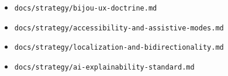 \begin{itemize}
  \begin{itemize}
  \tightlist
  \item
    \texttt{d\allowbreak{}o\allowbreak{}c\allowbreak{}s\allowbreak{}/\allowbreak{}s\allowbreak{}t\allowbreak{}r\allowbreak{}a\allowbreak{}t\allowbreak{}e\allowbreak{}g\allowbreak{}y\allowbreak{}/\allowbreak{}b\allowbreak{}i\allowbreak{}j\allowbreak{}o\allowbreak{}u\allowbreak{}-\allowbreak{}u\allowbreak{}x\allowbreak{}-\allowbreak{}d\allowbreak{}o\allowbreak{}c\allowbreak{}t\allowbreak{}r\allowbreak{}i\allowbreak{}n\allowbreak{}e\allowbreak{}.\allowbreak{}m\allowbreak{}d}
  \item
    \texttt{d\allowbreak{}o\allowbreak{}c\allowbreak{}s\allowbreak{}/\allowbreak{}s\allowbreak{}t\allowbreak{}r\allowbreak{}a\allowbreak{}t\allowbreak{}e\allowbreak{}g\allowbreak{}y\allowbreak{}/\allowbreak{}a\allowbreak{}c\allowbreak{}c\allowbreak{}e\allowbreak{}s\allowbreak{}s\allowbreak{}i\allowbreak{}b\allowbreak{}i\allowbreak{}l\allowbreak{}i\allowbreak{}t\allowbreak{}y\allowbreak{}-\allowbreak{}a\allowbreak{}n\allowbreak{}d\allowbreak{}-\allowbreak{}a\allowbreak{}s\allowbreak{}s\allowbreak{}i\allowbreak{}s\allowbreak{}t\allowbreak{}i\allowbreak{}v\allowbreak{}e\allowbreak{}-\allowbreak{}m\allowbreak{}o\allowbreak{}d\allowbreak{}e\allowbreak{}s\allowbreak{}.\allowbreak{}m\allowbreak{}d}
  \item
    \texttt{d\allowbreak{}o\allowbreak{}c\allowbreak{}s\allowbreak{}/\allowbreak{}s\allowbreak{}t\allowbreak{}r\allowbreak{}a\allowbreak{}t\allowbreak{}e\allowbreak{}g\allowbreak{}y\allowbreak{}/\allowbreak{}l\allowbreak{}o\allowbreak{}c\allowbreak{}a\allowbreak{}l\allowbreak{}i\allowbreak{}z\allowbreak{}a\allowbreak{}t\allowbreak{}i\allowbreak{}o\allowbreak{}n\allowbreak{}-\allowbreak{}a\allowbreak{}n\allowbreak{}d\allowbreak{}-\allowbreak{}b\allowbreak{}i\allowbreak{}d\allowbreak{}i\allowbreak{}r\allowbreak{}e\allowbreak{}c\allowbreak{}t\allowbreak{}i\allowbreak{}o\allowbreak{}n\allowbreak{}a\allowbreak{}l\allowbreak{}i\allowbreak{}t\allowbreak{}y\allowbreak{}.\allowbreak{}m\allowbreak{}d}
  \item
    \texttt{d\allowbreak{}o\allowbreak{}c\allowbreak{}s\allowbreak{}/\allowbreak{}s\allowbreak{}t\allowbreak{}r\allowbreak{}a\allowbreak{}t\allowbreak{}e\allowbreak{}g\allowbreak{}y\allowbreak{}/\allowbreak{}a\allowbreak{}i\allowbreak{}-\allowbreak{}e\allowbreak{}x\allowbreak{}p\allowbreak{}l\allowbreak{}a\allowbreak{}i\allowbreak{}n\allowbreak{}a\allowbreak{}b\allowbreak{}i\allowbreak{}l\allowbreak{}i\allowbreak{}t\allowbreak{}y\allowbreak{}-\allowbreak{}s\allowbreak{}t\allowbreak{}a\allowbreak{}n\allowbreak{}d\allowbreak{}a\allowbreak{}r\allowbreak{}d\allowbreak{}.\allowbreak{}m\allowbreak{}d}

\end{itemize}
\end{itemize}
